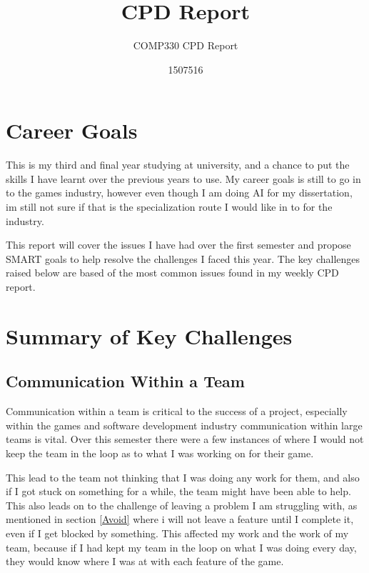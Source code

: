 \documentclass{scrartcl}
\title{CPD Report}
\subtitle{COMP330 CPD Report}
\author{1507516}
\begin{document}
\maketitle


\section{Career Goals}
This is my third and final year studying at university, and a chance to put the skills I have learnt over the previous years to use. 
My career goals is still to go in to the games industry, however even though I am doing AI for my dissertation, im still not sure if that is the specialization route I would like in to for the industry.

This report will cover the issues I have had over the first semester and propose SMART goals to help resolve the challenges I faced this year.
The key challenges raised below are based of the most common issues found in my weekly CPD report.


\section{Summary of Key Challenges}


\subsection{Communication Within a Team} \label{Comm}

Communication within a team is critical to the success of a project, especially within the games and software development industry communication within large teams is vital.
Over this semester there were a few instances of where I would not keep the team in the loop as to what I was working on for their game.

\par

This lead to the team not thinking that I was doing any work for them, and also if I got stuck on something for a while, the team might have been able to help.
This also leads on to the challenge of leaving a problem I am struggling with, as mentioned in section \ref{Avoid} where i will not leave a feature until I complete it, even if I get blocked by something.
This affected my work and the work of my team, because if I had kept my team in the loop on what I was doing every day, they would know where I was at with each feature of the game.
\par
\end{document}
